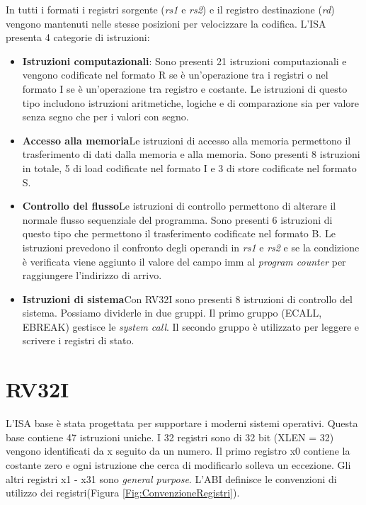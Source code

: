 \documentclass[12pt, a4paper]{report}
\begin{document}
In tutti i formati i registri sorgente (\textit{rs1} e \textit{rs2}) e il registro destinazione (\textit{rd}) vengono mantenuti nelle stesse posizioni per velocizzare la codifica.
L'ISA presenta 4 categorie di istruzioni:
\begin{itemize}
	\item \textbf{Istruzioni computazionali}: Sono presenti 21 istruzioni computazionali e vengono codificate nel formato R se è un'operazione tra i registri o nel formato I se è un'operazione tra registro e costante. Le istruzioni di questo tipo includono istruzioni aritmetiche, logiche e di comparazione sia per valore senza segno che per i valori con segno.
	\item \textbf{Accesso alla memoria}Le istruzioni di accesso alla memoria permettono il trasferimento di dati dalla memoria e alla memoria. Sono presenti 8 istruzioni in totale, 5 di load codificate nel formato I e 3 di store codificate nel formato S.
	\item \textbf{Controllo del flusso}Le istruzioni di controllo permettono di alterare il normale flusso sequenziale del programma. Sono presenti 6 istruzioni di questo tipo che permettono il trasferimento codificate nel formato B. Le istruzioni prevedono il confronto degli operandi in \textit{rs1} e \textit{rs2} e se la condizione è verificata viene aggiunto il valore del campo imm al \textit{program counter} per raggiungere l'indirizzo di arrivo.
	\item \textbf{Istruzioni di sistema}Con RV32I sono presenti 8 istruzioni di controllo del sistema. Possiamo dividerle in due gruppi. Il primo gruppo (ECALL, EBREAK) gestisce le \textit{system call}. Il secondo gruppo è utilizzato per leggere e scrivere i registri di stato.
\end{itemize}


\section{RV32I}
L'ISA base è stata progettata per supportare i moderni sistemi operativi. Questa base contiene 47 istruzioni uniche. I 32 registri sono di 32 bit (XLEN = 32) vengono identificati da x seguito da un numero. Il primo registro x0 contiene la costante zero e ogni istruzione che cerca di modificarlo solleva un eccezione. Gli altri registri x1 - x31 sono \textit{general purpose}. L'ABI definisce le convenzioni di utilizzo dei registri(Figura \ref{Fig:ConvenzioneRegistri}).
\end{document}
